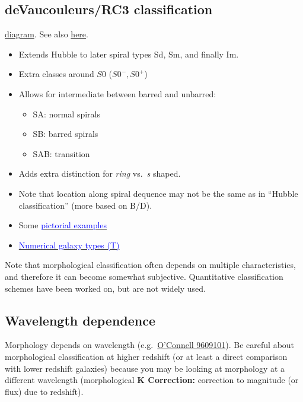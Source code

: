 \documentclass{article}
\begin{document}
\subsection{deVaucouleurs/RC3 classification}
\href{http://astronomy.nmsu.edu/holtz/a555/html/diagrams/a616/rc3class.htm}
{diagram}.
See also \href{http://astronomy.as.virginia.edu}{here}.
\begin{itemize}
    \item Extends Hubble to later spiral types Sd, Sm, and finally Im.
    \item Extra classes around $S0$ ($S0^{-}, S0^{+}$)
    \item Allows for intermediate between barred and unbarred:
        \begin{itemize}
            \item SA: normal spirals
            \item SB: barred spirals
            \item SAB: transition
        \end{itemize}
    \item Adds extra distinction for \emph{ring} vs.\ \emph{s} shaped.
    \item Note that location along spiral dequence may not be the same as in
        ``Hubble classification'' (more based on B/D).
    \item Some \href{http://astronomy.as.virginia.edu}
        {\textcolor{blue}{pictorial examples}}
    \item \href{http://astronomy.nmsu.edu/holtz/a555/html/diagrams/a616/numtype.htm}
        {\textcolor{blue}{Numerical galaxy types (T)}}
\end{itemize}
Note that
morphological classification often depends on multiple characteristics,
and therefore it can become somewhat subjective. Quantitative classification
schemes have been worked on, but are not widely used.

\subsection{Wavelength dependence}
Morphology depends on wavelength
(e.g.\ \href{http://ned.ipac.caltech.edu/level5/Kuchinski/frames.html}
{O'Connell 9609101}).
Be careful about morphological classification at higher redshift
(or at least a direct comparison with lower redshift galaxies)
because you may be looking at morphology at a different wavelength
(morphological \textbf{K Correction:} correction to magnitude (or flux) due
to redshift).
\end{document}
